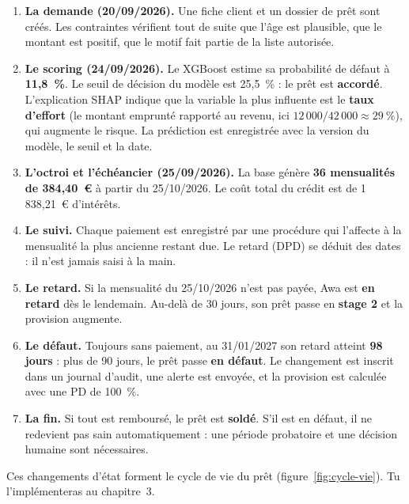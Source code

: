\begin{enumerate}[leftmargin=1.6em, itemsep=0.45em]
\item \textbf{La demande (20/09/2026).} Une fiche client et un dossier de prêt sont créés. Les contraintes
vérifient tout de suite que l'âge est plausible, que le montant est positif, que le motif fait partie
de la liste autorisée.
\item \textbf{Le scoring (24/09/2026).} Le XGBoost estime sa probabilité de défaut à \textbf{11,8~\%}. Le
seuil de décision du modèle est 25,5~\% : le prêt est \textbf{accordé}. L'explication SHAP indique que
la variable la plus influente est le \textbf{taux d'effort} (le montant emprunté rapporté au revenu,
ici $12\,000 / 42\,000 \approx 29~\%$), qui augmente le risque. La prédiction est enregistrée avec la
version du modèle, le seuil et la date.
\item \textbf{L'octroi et l'échéancier (25/09/2026).} La base génère \textbf{36 mensualités de
384,40~€} à partir du 25/10/2026. Le coût total du crédit est de 1\,838,21~€ d'intérêts.
\item \textbf{Le suivi.} Chaque paiement est enregistré par une procédure qui l'affecte à la mensualité la
plus ancienne restant due. Le retard (DPD) se déduit des dates : il n'est jamais saisi à la main.
\item \textbf{Le retard.} Si la mensualité du 25/10/2026 n'est pas payée, Awa est \textbf{en retard} dès
le lendemain. Au-delà de 30 jours, son prêt passe en \textbf{stage 2} et la provision augmente.
\item \textbf{Le défaut.} Toujours sans paiement, au 31/01/2027 son retard atteint \textbf{98 jours} :
plus de 90 jours, le prêt passe \textbf{en défaut}. Le changement est inscrit dans un journal d'audit,
une alerte est envoyée, et la provision est calculée avec une PD de 100~\%.
\item \textbf{La fin.} Si tout est remboursé, le prêt est \textbf{soldé}. S'il est en défaut, il ne
redevient pas sain automatiquement : une période probatoire et une décision humaine sont nécessaires.
\end{enumerate}

Ces changements d'état forment le cycle de vie du prêt (figure~\ref{fig:cycle-vie}). Tu
l'implémenteras au chapitre~3.

